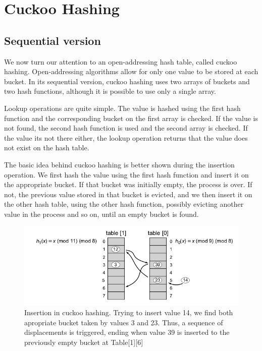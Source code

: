 \section{Cuckoo Hashing}
\subsection{Sequential version}

We now turn our attention to an open-addressing hash table, called cuckoo hashing. Open-addressing algorithms allow for only one value to be stored at each bucket. In its sequential version, cuckoo hashing uses two arrays of buckets and two hash functions, although it is possible to use only a single array. 

Lookup operations are quite simple. The value is hashed using the first hash function and the corresponding bucket on the first array is checked. If the value is not found, the second hash function is used and the second array is  checked.  If the value its not there either, the lookup operation returns that the value does not exist on the hash table.

The basic idea behind cuckoo hashing is better shown during the insertion operation. We first hash the value using the first hash function and insert it on the appropriate bucket. If that bucket was initially empty, the process is over. If not, the previous value stored in that bucket is evicted, and we then insert it  on the other hash table, using the other hash function, possibly evicting another value in the process and so on, until an empty bucket is found.

\begin{figure}
 \centering
  \includegraphics[scale=0.5]{cuckoo_hashing.png}
\caption{Insertion in cuckoo hashing. Trying to insert value 14, we find both apropriate bucket taken by values 3 and 23. Thus, a sequence of displacements is triggered, ending when value 39 is inserted to the previously empty bucket at Table[1][6] }
\end{figure}

